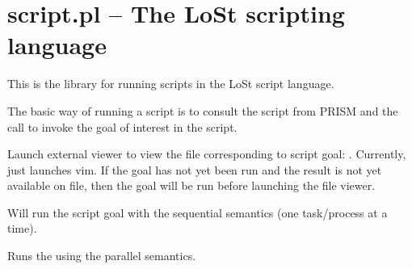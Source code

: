 


\section{script.pl -- The LoSt scripting language}

\label{sec:script}

This is the library for running scripts in the LoSt script language.

The basic way of running a script is to consult the script from PRISM
and the call  to invoke the goal of interest in the script.\vspace{0.7cm}

\begin{description}
Launch external viewer to view the file corresponding to script goal: . Currently, just launches vim.
If the goal has not yet been run and the result is not yet available on file, then the goal will be run
before launching the file viewer.

Will run the script goal  with the sequential semantics (one task/process at a time). 

Runs the  using the parallel semantics. 
\end{description}


